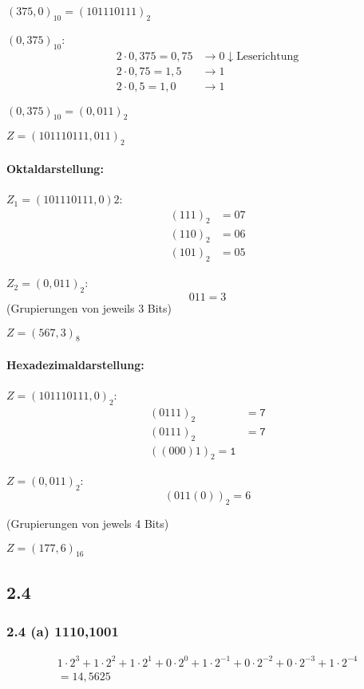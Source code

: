 \documentclass[11pt,a4paper]{article}
\begin{document}
$(375,0)_{10}= (101110111)_2$

$(0,375)_{10}$:
\begin{align*}
2 \cdot 0,375 = 0,75 &\rightarrow 0 \downarrow \mbox{Leserichtung}\\
2 \cdot 0,75= 1,5 &\rightarrow 1\\
2 \cdot 0,5 = 1,0 &\rightarrow 1
\end{align*}

$(0,375)_{10} = (0,011)_{2}$

$Z = (101110111,011)_2$

\paragraph{Oktaldarstellung:}
$Z_1 = (101110111,0)2$:
\begin{align*}
(111)_2 &= 07\\
(110)_2 &= 06\\
(101)_2 &= 05
\end{align*}

$Z_2 = (0,011)_2$:
\begin{equation*}
011 = 3
\end{equation*}
(Grupierungen von jeweils 3 Bits)

$Z = (567,3)_8$

\paragraph{Hexadezimaldarstellung:}

$Z = (101110111,0)_2$:
\begin{align*}
(0111)_2 &= \mathtt{7}\\
(0111)_2 &= \mathtt{7}\\
((000)1)_2 = \mathtt{1}
\end{align*}

$Z = (0,011)_2$:
\begin{equation*}
(011(0))_2 = 6
\end{equation*}

(Grupierungen von jewels 4 Bits)

$Z = (177,6)_{16}$

\subsection{2.4}

\subsubsection{2.4 (a) 1110,1001}
\begin{align*}
1\cdot2^3 + 1\cdot2^2 + 1\cdot2^1 + 0\cdot2^0 + 1\cdot2^{-1} + 0\cdot2^{-2} + 0\cdot2^{-3} + 1\cdot2^{-4}\\
= 14,5625
\end{align*}
\end{document}
